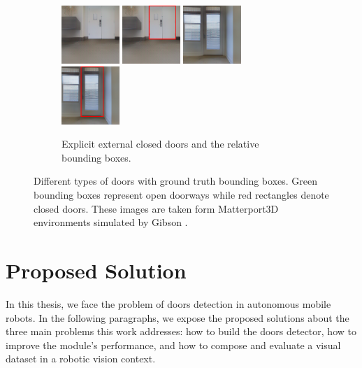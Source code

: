 \begin{figure}[h!]
	\begin{subfigure}[b]{\linewidth}
		\centering
		\includegraphics[width=0.24\textwidth]{images/explicitexternalclosed1.png}
		\hfill
		\includegraphics[width=0.24\textwidth]{images/explicitexternalclosed1boxed.png}
		\hfill
		\includegraphics[width=0.24\textwidth]{images/explicitexternalclosed2.png}
		\hfill
		\includegraphics[width=0.24\textwidth]{images/explicitexternalclosed2boxed.png}
		\caption{Explicit external closed doors and the relative bounding boxes.}
	\end{subfigure}
	\caption{Different types of doors with ground truth bounding boxes. Green bounding boxes represent open doorways while red rectangles denote closed doors. These images are taken form Matterport3D \cite{matterport} environments simulated by Gibson \cite{gibson}.}
\end{figure}

\section{Proposed Solution}
\label{sec:solution}
In this thesis, we face the problem of doors detection in autonomous mobile robots. In the following paragraphs, we expose the proposed solutions about the three main problems this work addresses: how to build the doors detector, how to improve the module's performance, and how to compose and evaluate a visual dataset in a robotic vision context.

